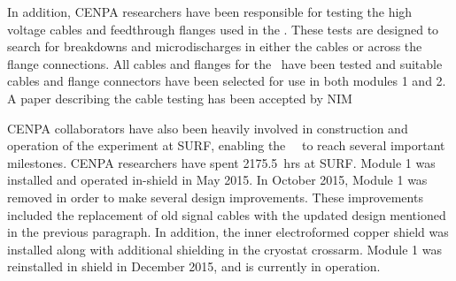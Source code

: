 In addition, CENPA researchers have been responsible for testing the high voltage cables and feedthrough flanges used in the \MJDemo. These tests are designed to search for breakdowns and microdischarges in either the cables or across the flange connections. All cables and flanges for the \MJDemo\ have been tested and suitable cables and flange connectors have been selected for use in both modules 1 and 2. A paper describing the cable testing has been accepted by NIM

CENPA collaborators have also been heavily involved in construction and operation of the experiment at SURF, enabling the \MJ~\MJDemo\ to reach several important milestones. CENPA researchers have spent 2175.5~hrs at SURF. Module 1 was installed and operated in-shield in May 2015. In October 2015, Module 1 was removed in order to make several design improvements. These improvements included the replacement of old signal cables with the updated design mentioned in the previous paragraph. In addition, the inner electroformed copper shield was installed along with additional shielding in the cryostat crossarm. Module 1 was reinstalled in shield in December 2015, and is currently in operation.
  
